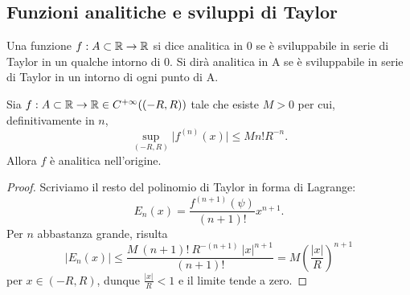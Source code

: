 \documentclass[Completo.tex]{subfiles}
\begin{document}
\subsection{Funzioni analitiche e sviluppi di Taylor}
\begin{Def}
	Una funzione $f: A \sset \bb[R] \ra \bb[R]$ si dice analitica in 0 se è sviluppabile in serie di Taylor in un qualche intorno di 0. Si dirà analitica in A se è sviluppabile in serie di Taylor in un intorno di ogni punto di A.
\end{Def}
\begin{eTh}
	Sia $f: A \sset \bb[R] \ra \bb[R] \in C^{+\infty}((-R,R))$ tale che esiste $M > 0$ per cui, definitivamente in $n$,
	\begin{equation*}
	\sup_{(-R,R)} \vert f^{(n)}(x) \vert \leq M n! R^{-n}.
	\end{equation*}
	Allora $f$ è analitica nell'origine.
\end{eTh}
\begin{proof}
	Scriviamo il resto del polinomio di Taylor in forma di Lagrange:
	\begin{equation*}
	E_n(x) = \frac{f^{(n+1)}(\psi)}{(n+1)!} x^{n+1}.
	\end{equation*}
	Per $n$ abbastanza grande, risulta
	\begin{equation*}
	\vert E_n(x) \vert \leq \frac{M \ (n+1)! \ R^{-(n+1)}\ \vert x \vert^{n+1}}{(n+1)!} = M \left(\frac{\vert x \vert}{R}\right)^{n+1}
	\end{equation*}
	per $x \in (-R, R)$, dunque $\frac{\vert x \vert}{R} < 1$ e il limite tende a zero.
\end{proof}
\end{document}
